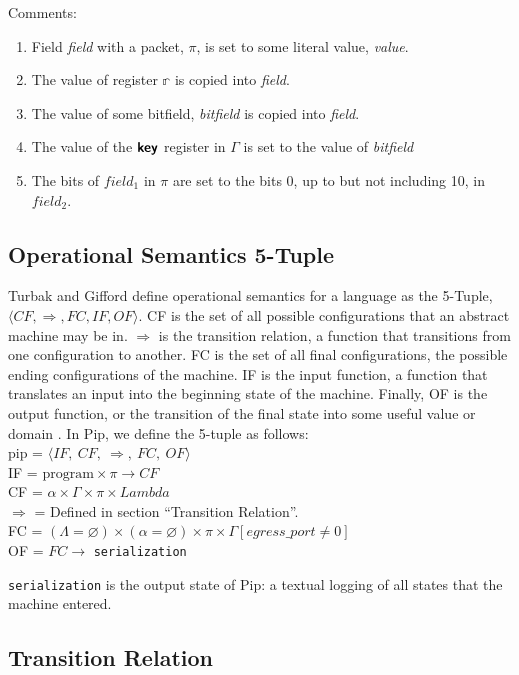 Comments:
\begin{enumerate}
\item Field \textit{field} with a packet, $\pi$, is set to some literal value, \textit{value}.
\item The value of register $\mathbb{r}$ is copied into \textit{field}.
\item The value of some bitfield, \textit{bitfield} is copied into \textit{field}.
\item The value of the $\bm{\mathsf{{key}}}$ register in $\Gamma$ is set to the value of \textit{bitfield}
\item The bits of $field_1$ in $\pi$ are set to the bits 0, up to but not including 10, in $field_2$.
\end{enumerate}


\subsection{Operational Semantics 5-Tuple}
Turbak and Gifford define operational semantics for a language as the 5-Tuple, $\langle CF, \Rightarrow, FC, IF, OF \rangle$. CF is the set of all possible configurations that an abstract machine may be in. $\Rightarrow$ is the transition relation, a function that transitions from one configuration to another. FC is the set of all final configurations, the possible ending configurations of the machine. IF is the input function, a function that translates an input into the beginning state of the machine. Finally, OF is the output function, or the transition of the final state into some useful value or domain \cite{Turbak2008}. In Pip, we define the 5-tuple as follows:\\
pip = $\langle IF, \ CF, \ \Rightarrow, \ FC, \ OF \rangle$\\
IF = $\textrm{program} \times \pi \rightarrow CF$ \\
CF = $\alpha \times \Gamma \times \pi \times Lambda$ \\
$\Rightarrow$ = Defined in section ``Transition Relation''. \\
FC = $(\Lambda = \varnothing) \times (\alpha = \varnothing) \times \pi \times \Gamma[egress\_port \neq 0]$ \\
OF = $FC \rightarrow$ \texttt{serialization}

\texttt{serialization} is the output state of Pip: a textual logging of all states that the machine entered.
\subsection{Transition Relation}
\setlength{\mathindent}{0pt}

